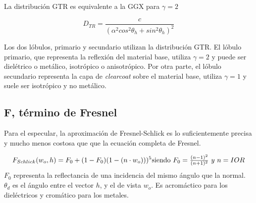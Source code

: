                 La distribuci\'on GTR es equivalente a la GGX para $\gamma = 2$

                \begin{equation}
                    D_{TR} = \frac
                    {c}
                    {(\alpha^2 cos^2 \theta_h + sin^2 \theta_h)^2}
                \end{equation}
                \singlespacing

                Los dos l\'obulos, primario y secundario utilizan la distribuci\'on GTR. El l\'obulo primario,
                que representa la reflexi\'on del material base, utiliza $\gamma = 2$ y puede ser diel\'etrico o met\'alico,
                isotr\'opico o anisotr\'opico. Por otra parte, el l\'obulo secundario representa la capa de \textit{clearcoat}
                sobre el material base, utiliza $\gamma = 1$ y suele ser isotr\'opico y no met\'alico.\\

            \subsection*{F, t\'ermino de Fresnel}
                Para el especular, la aproximaci\'on de Fresnel-Schlick \autocite{schlick} es lo suficientemente precisa y mucho menos costosa que
                que la ecuaci\'on completa de Fresnel.
    
                \begin{equation}
                    F_{Schlick}(w_o, h) = F_0 + (1 - F_0) (1 - (n\cdot{w_o})))^5
                    $$
                    $$
                    \textrm{siendo}\ F_0 = \frac
                    {(n - 1)^2}
                    {(n + 1)^2}
                    \ y \ n = IOR
                \end{equation}
                \singlespacing
                $F_0$ representa la reflectancia de una incidencia del mismo \'angulo que la normal. $\theta_d$ es el \'angulo
                entre el vector $h$, y el de vista $w_o$. Es acrom\'actico para los diel\'ectricos y crom\'atico para los metales.\\
    
